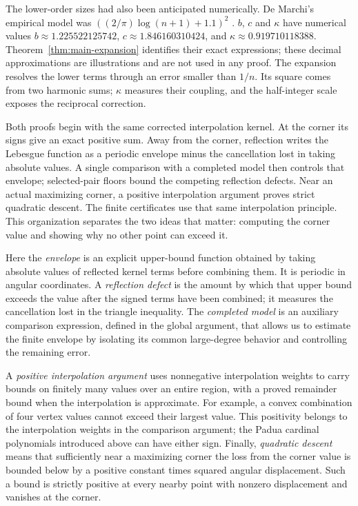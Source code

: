 The lower-order sizes had also been anticipated numerically. De Marchi's
empirical model was $((2/\pi)\log(n+1)+1.1)^2$
\cite[Section~1.1, pp.~3--5]{DeMarchi2005NearOptimal}.
$b$, $c$ and $\kappa$ have numerical values
$b\approx1.225522125742$, $c\approx1.846160310424$, and
$\kappa\approx0.919710118388$. Theorem~\ref{thm:main-expansion}
identifies their exact expressions; these decimal approximations are
illustrations and are not used in any proof. The expansion resolves the lower terms through
an error smaller than $1/n$. Its square
comes from two harmonic sums; $\kappa$ measures their coupling, and the
half-integer scale exposes the reciprocal correction.

Both proofs begin with the same corrected interpolation kernel. At the
corner its signs give an exact positive sum. Away from the corner, reflection
writes the Lebesgue function as a periodic envelope minus the cancellation
lost in taking absolute values. A single comparison with a completed model
then controls that envelope; selected-pair floors bound the competing
reflection defects. Near an
actual maximizing corner, a positive interpolation argument proves strict
quadratic descent. The finite certificates use that same interpolation
principle. This organization separates the two ideas that matter: computing
the corner value and showing why no other point can exceed it.

Here the \emph{envelope} is an explicit upper-bound function obtained
by taking absolute values of reflected kernel terms before combining
them. It is periodic in angular coordinates. A \emph{reflection defect}
is the amount by which that upper bound exceeds the value after the
signed terms have been combined; it measures the cancellation lost in
the triangle inequality. The \emph{completed model} is an auxiliary
comparison expression, defined in the global argument, that allows us
to estimate the finite envelope by isolating its common large-degree
behavior and controlling the remaining error.

A \emph{positive interpolation argument} uses nonnegative interpolation
weights to carry bounds on finitely many values over an entire region,
with a proved remainder bound when the interpolation is approximate.
For example, a convex combination of four vertex values cannot exceed
their largest value. This positivity belongs to the interpolation
weights in the comparison argument; the Padua cardinal polynomials
introduced above can have either sign. Finally, \emph{quadratic descent}
means that sufficiently near a maximizing corner the loss from the
corner value is bounded below by a positive constant times squared
angular displacement. Such a bound is strictly positive at every
nearby point with nonzero displacement and vanishes at the corner.

